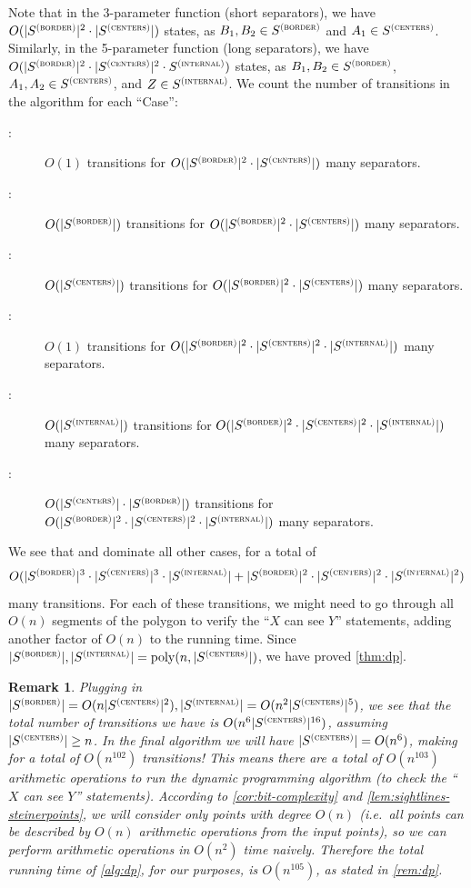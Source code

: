 \documentclass[10pt,a4paper]{article}
\newtheorem{remark}{Remark}[section]
\newcommand\Scen{S^{\textsc{(centers)}}}
\newcommand\Sint{S^{\textsc{(internal)}}}
\newcommand\Sbor{S^{\textsc{(border)}}}
\newcommand\poly{\mathrm{poly}}
\begin{document}
Note that in the 3-parameter function  (short separators), we have $O(|\Sbor|^2\cdot|\Scen|)$ states, as $B_1,B_2\in \Sbor$ and $A_1\in \Scen$.
Similarly, in the 5-parameter function  (long separators), we have $O(|\Sbor|^2\cdot|\Scen|^2\cdot \Sint)$ states, as $B_1,B_2\in \Sbor$, $A_1,A_2\in \Scen$, and $Z\in \Sint$.
We count the number of transitions in the algorithm for each ``Case'':
\begin{description}
\item[:] $O(1)$ transitions for $O(|\Sbor|^2\cdot |\Scen|)$ many separators.
\item[:] $O(|\Sbor|)$ transitions for $O(|\Sbor|^2\cdot |\Scen|)$ many separators.
\item[:] $O(|\Scen|)$ transitions for $O(|\Sbor|^2\cdot |\Scen|)$ many separators.
\item[:] $O(1)$ transitions for $O(|\Sbor|^2\cdot |\Scen|^2\cdot |\Sint|)$ many separators.
\item[:] $O(|\Sint|)$ transitions for $O(|\Sbor|^2\cdot |\Scen|^2\cdot |\Sint|)$ many separators.
\item[:] $O(|\Scen|\cdot |\Sbor|)$ transitions for $O(|\Sbor|^2\cdot |\Scen|^2\cdot |\Sint|)$ many separators.
\end{description}
We see that  and  dominate all other cases, for a total of
\begin{equation*}
O(|\Sbor|^3\cdot|\Scen|^3\cdot|\Sint| +
|\Sbor|^2\cdot|\Scen|^2\cdot|\Sint|^2)
\end{equation*}
many transitions.
For each of these transitions, we might need to go through all $O(n)$ segments of the polygon to verify the ``$X$ can see $Y$'' statements, adding another factor of $O(n)$ to the running time. Since $|\Sbor|, |\Sint| = \poly(n,|\Scen|)$, we have proved \cref{thm:dp}.
\begin{remark}
Plugging in $|\Sbor| = O(n|\Scen|^2), |\Sint| = O(n^2|\Scen|^5)$, we see that the total number of transitions we have is
$O(n^6|\Scen|^{16})$, assuming $|\Scen| \ge n$. In the final algorithm we will have $|\Scen| = O(n^6)$, making for a total of $O(n^{102})$ transitions!
This means there are a total of $O(n^{103})$  arithmetic operations to run the dynamic programming algorithm (to check the ``$X$ can see $Y$'' statements). 
According to \cref{cor:bit-complexity} and \cref{lem:sightlines-steinerpoints}, we will consider only points with degree $O(n)$ (i.e.\ all points can be described by $O(n)$ arithmetic operations from the input points), so we can perform arithmetic operations in $O(n^2)$ time naively. 
Therefore the total running time of \cref{alg:dp}, for our purposes, is $O(n^{105})$, as stated in \cref{rem:dp}.
\end{remark}
\end{document}

